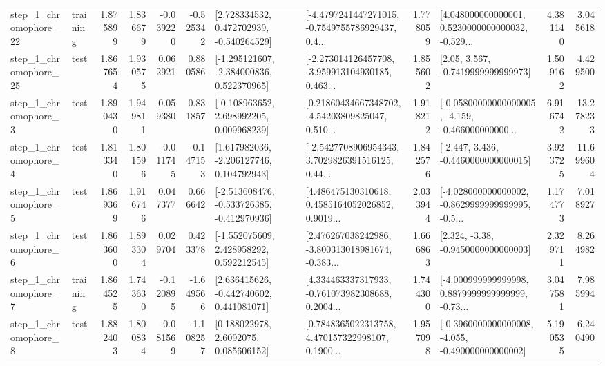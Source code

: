 \begin{tabular}{llrrrrllrlrr}
    step\_1\_chromophore\_22 &  training &      1.875899 &    1.836679 &     -0.039220 & -0.525342 &    [2.728334532, 0.472702939, -0.540264529] &  [-4.4797241447271015, -0.7549755786929437, 0.4... &       1.778059 &  [4.048000000000001, 0.5230000000000032, -0.529... &            4.381140 &          3.045618 \\
    step\_1\_chromophore\_25 &      test &      1.867654 &    1.930575 &      0.062921 &  0.880586 &   [-1.295121607, -2.384000836, 0.522370965] &  [-2.273014126457708, -3.959913104930185, 0.463... &       1.855602 &                 [2.05, 3.567, -0.7419999999999973] &            1.509162 &          4.429500 \\
     step\_1\_chromophore\_3 &      test &      1.890430 &    1.949811 &      0.059380 &  0.831857 &    [-0.108963652, 2.698992205, 0.009968239] &  [0.21860434667348702, -4.54203809825047, 0.510... &       1.918212 &  [-0.05800000000000005, -4.159, -0.466000000000... &            6.916742 &         13.278233 \\
     step\_1\_chromophore\_4 &      test &      1.813340 &    1.801596 &     -0.011745 & -0.147153 &    [1.617982036, -2.206127746, 0.104792943] &  [-2.5427708906954343, 3.7029826391516125, 0.44... &       1.842576 &               [-2.447, 3.436, -0.4460000000000015] &            3.923725 &         11.699604 \\
     step\_1\_chromophore\_5 &      test &      1.869369 &    1.916746 &      0.047377 &  0.666642 &  [-2.513608476, -0.533726385, -0.412970936] &  [4.486475130310618, 0.4585164052026852, 0.9019... &       2.033944 &  [-4.028000000000002, -0.8629999999999995, -0.5... &            1.174773 &          7.018927 \\
     step\_1\_chromophore\_6 &      test &      1.863600 &    1.893304 &      0.029704 &  0.423378 &    [-1.552075609, 2.428958292, 0.592212545] &  [2.476267038242986, -3.800313018981674, -0.383... &       1.666863 &                [2.324, -3.38, -0.9450000000000003] &            2.329711 &          8.264982 \\
     step\_1\_chromophore\_7 &  training &      1.864525 &    1.743630 &     -0.120895 & -1.649566 &    [2.636415626, -0.442740602, 0.441081071] &  [4.334463337317933, -0.761073982308688, 0.2004... &       1.744300 &  [-4.000999999999998, 0.8879999999999999, -0.73... &            3.047581 &          7.985994 \\
     step\_1\_chromophore\_8 &      test &      1.882403 &    1.800834 &     -0.081569 & -1.108257 &       [0.188022978, 2.6092075, 0.085606152] &  [0.7848365022313758, 4.470157322998107, 0.1900... &       1.957098 &  [-0.3960000000000008, -4.055, -0.490000000000002] &            5.190535 &          6.240490 \\

\end{tabular}
